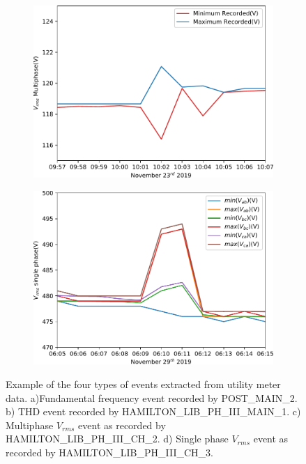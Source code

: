 \begin{figure}[h]
\begin{subfigure}{.45\textwidth}
        \caption{}
        \label{expdes:fig:gt_example:thd}
    \end{subfigure}
    \begin{subfigure}{.45\textwidth}
        \centering
        \includegraphics[width=1\linewidth]{img/napali_eval/gt/gt_vpoly_example.pdf}
        \caption{}
        \label{expdes:fig:gt_example:vpoly}
    \end{subfigure}\hspace{5mm}
    \begin{subfigure}{.45\textwidth}
        \centering
        \includegraphics[width=1\linewidth]{img/napali_eval/gt/gt_vsingle_example.pdf}
        \caption{}
        \label{expdes:fig:gt_example:vsingle}
    \end{subfigure}

    \caption{Example of the four types of events extracted from utility meter data.
    a)Fundamental frequency event recorded by POST\_MAIN\_2.
    b) THD event recorded by HAMILTON\_LIB\_PH\_III\_MAIN\_1.
    c) Multiphase $V_{rms}$ event as recorded by HAMILTON\_LIB\_PH\_III\_CH\_2.
    d) Single phase $V_{rms}$ event as recorded by HAMILTON\_LIB\_PH\_III\_CH\_3.}

    \label{expdes:fig:gt_example}
\end{figure}

